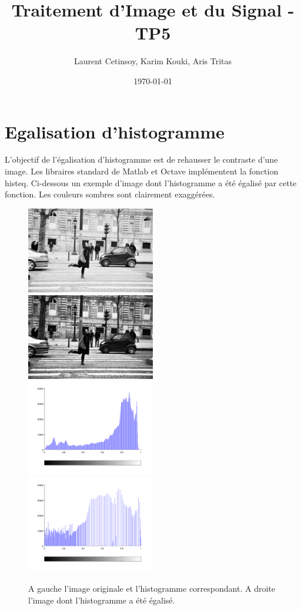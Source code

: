\documentclass{article}
\title{Traitement d'Image et du Signal - TP5}
\author{Laurent Cetinsoy, Karim Kouki, Aris Tritas }
\date{\today}
\begin{document}
\maketitle

\section{Egalisation d'histogramme}
L'objectif de l'égalisation d'histogramme est de rehausser le contraste d'une image. Les libraires standard de Matlab et Octave implémentent la fonction \textsf{histeq}. Ci-dessous un exemple d'image dont l'histogramme a été égalisé par cette fonction. Les couleurs sombres sont clairement exaggérées.

\begin{figure}[h]
	\includegraphics[width=0.5\textwidth]{P11.jpg}
	\includegraphics[width=0.5\textwidth]{P11eq.png}
	\newline
	\includegraphics[width=0.5\textwidth]{hist_p11.png}
	\includegraphics[width=0.5\textwidth]{hist_p11eq.png}
  \caption{A gauche l'image originale et l'histogramme correspondant. A droite l'image dont l'histogramme a été égalisé. }
\end{figure}
\end{document}
